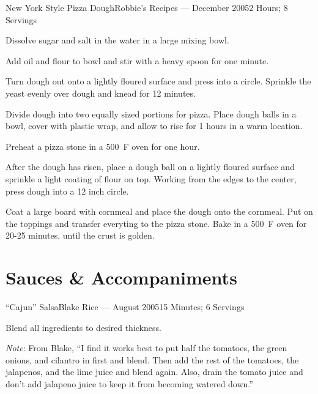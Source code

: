 \documentclass{article}
\begin{document}
\begin{recipe}{New York Style Pizza Dough}{Robbie's Recipes --- December 2005}{2  Hours; 8 Servings}

   Dissolve sugar and salt in the water in a large mixing bowl.

   Add oil and flour to bowl and stir with a heavy spoon for one minute.

   Turn dough out onto a lightly floured surface and press into a circle.
   Sprinkle the yeast evenly over dough and knead for 12 minutes.

   \newstep 
   Divide dough into two equally sized portions for pizza.  Place dough balls in
   a bowl, cover with plastic wrap, and allow to rise for 1  hours in a
   warm location.

   \newstep 
   Preheat a pizza stone in a 500\ \0F oven for one hour.

   \newstep
   After the dough has risen, place a dough ball on a lightly floured surface
   and sprinkle a light coating of flour on top.  Working from the edges to the
   center, press dough into a 12 inch circle.

   Coat a large board with cornmeal and place the dough onto the cornmeal.  Put
   on the toppings and transfer everyting to the pizza stone.  Bake in a 500\
   \0F oven for 20-25 minutes, until the crust is golden.

\end{recipe}

\section{Sauces \& Accompaniments}

\begin{recipe}{``Cajun'' Salsa}{Blake Rice --- August 2005}{15 Minutes; 6 Servings}

   Blend all ingredients to desired thickness.

   \freeform
   \emph{Note}: From Blake, ``I find it works best to put half the tomatoes, the
   green onions, and cilantro in first and blend. Then add the rest of the
   tomatoes, the jalapenos, and the lime juice and blend again. Also, drain the
   tomato juice and don't add jalapeno juice to keep it from becoming watered
   down.''

\end{recipe}
\end{document}
